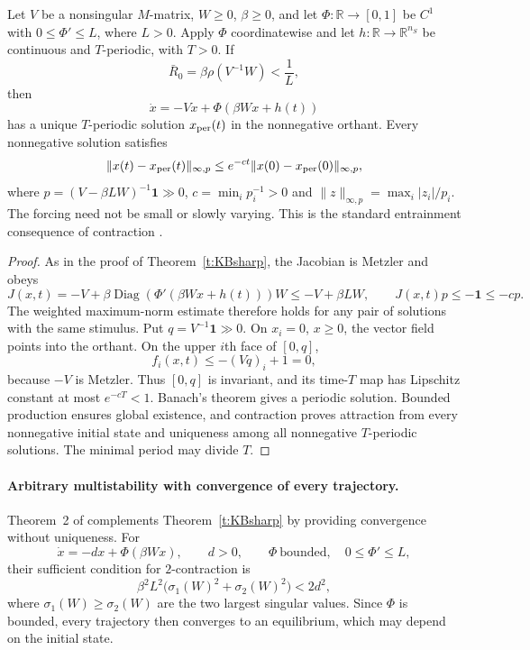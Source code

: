 Let $V$ be a nonsingular $M$-matrix, $W\ge0$, $\beta\ge0$, and let $\Phi:\mathbb R\to[0,1]$ be $C^1$
with $0\le \Phi'\le L$, where $L>0$. Apply $\Phi$ coordinatewise and let
$h:\mathbb R\to\mathbb R^{n_S}$ be continuous and $T$-periodic, with $T>0$. If
\[
 \bar R_0=\beta\rho(V^{-1}W)<\frac1L,
\]
then
\[
 \dot x=-Vx+\Phi(\beta Wx+h(t))
\]
has a unique $T$-periodic solution $x_{\rm per}(t)$ in the nonnegative orthant. Every nonnegative
solution satisfies
\[
 \|x(t)-x_{\rm per}(t)\|_{\infty,p}
 \le e^{-ct}\|x(0)-x_{\rm per}(0)\|_{\infty,p},
\]
where $p=(V-\beta LW)^{-1}\mathbf1\gg0$, $c=\min_i p_i^{-1}>0$ and
$\|z\|_{\infty,p}=\max_i|z_i|/p_i$. The forcing need not be small or slowly varying.
This is the standard entrainment consequence of contraction
\cite{RussoDiBernardoSontag2010,Bullo2026}.
\eeC
\begin{proof}
As in the proof of Theorem~\ref{t:KBsharp}, the Jacobian is Metzler and obeys
\[
 J(x,t)=-V+\beta\operatorname{Diag}(\Phi'(\beta Wx+h(t)))W\le -V+\beta LW,
 \qquad J(x,t)p\le-\mathbf1\le-cp.
\]
The weighted maximum-norm estimate therefore holds for any pair of solutions with the same stimulus.
Put $q=V^{-1}\mathbf1\gg0$. On $x_i=0$, $x\ge0$, the vector field points into the orthant. On the
upper $i$th face of $[0,q]$,
\[
 f_i(x,t)\le-(Vq)_i+1=0,
\]
because $-V$ is Metzler. Thus $[0,q]$ is invariant, and its time-$T$ map has Lipschitz constant at
most $e^{-cT}<1$. Banach's theorem gives a periodic solution. Bounded production ensures global
existence, and contraction proves attraction from every nonnegative initial state and uniqueness
among all nonnegative $T$-periodic solutions. The minimal period may divide $T$.
\end{proof}

\paragraph{Arbitrary multistability with convergence of every trajectory.}
Theorem~2 of \cite{OfirOvseevichMargaliot2024} complements Theorem~\ref{t:KBsharp} by providing
convergence without uniqueness. For
\[
 \dot x=-dx+\Phi(\beta Wx),\qquad d>0,\qquad \Phi\ \text{bounded},\quad 0\le \Phi'\le L,
\]
their sufficient condition for $2$-contraction is
\[
 \beta^2L^2\bigl(\sigma_1(W)^2+\sigma_2(W)^2\bigr)<2d^2,
\]
where $\sigma_1(W)\ge\sigma_2(W)$ are the two largest singular values. Since $\Phi$ is bounded,
every trajectory then converges to an equilibrium, which may depend on the initial state.

